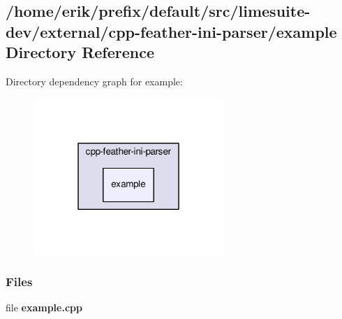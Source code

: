\subsection{/home/erik/prefix/default/src/limesuite-\/dev/external/cpp-\/feather-\/ini-\/parser/example Directory Reference}
\label{dir_45b5ff758e7894add942dc907c42995e}
Directory dependency graph for example\+:
\nopagebreak
\begin{figure}[H]
\begin{center}
\leavevmode
\includegraphics[width=204pt]{dir_45b5ff758e7894add942dc907c42995e_dep}
\end{center}
\end{figure}
\subsubsection*{Files}
\begin{DoxyCompactItemize}
\item 
file {\bf example.\+cpp}
\end{DoxyCompactItemize}
